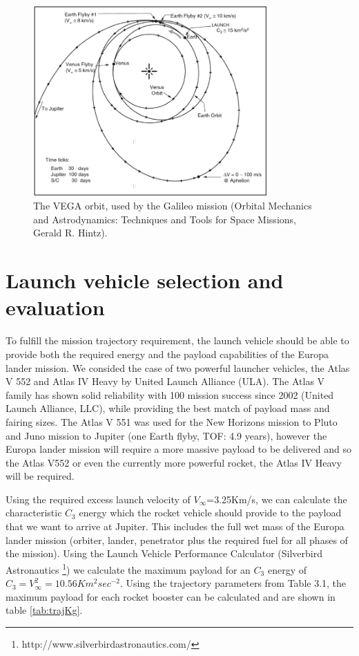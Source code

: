 \begin{figure}[htb!]
\centering
\includegraphics[width=0.8\textwidth]{figures/Orbiter/VEEGA.png}
\caption{The  VEGA orbit, used by the Galileo mission (Orbital Mechanics and Astrodynamics: Techniques and Tools for Space Missions, Gerald R. Hintz).}
\end{figure}
\section{Launch vehicle selection and evaluation}
To fulfill the mission trajectory requirement, the launch vehicle should be able to provide both the required energy and the payload capabilities of the Europa lander mission. We consided the case of two powerful launcher vehicles, the Atlas V 552 and Atlas IV Heavy by United Launch Alliance (ULA). The Atlas V family has shown solid reliability with 100 mission success since 2002 (United Launch Alliance, LLC), while providing the best match of payload mass and fairing sizes. The Atlas V 551 was used for the New Horizons mission to Pluto and Juno mission to Jupiter (one Earth flyby, TOF: 4.9 years), however the Europa lander mission will require a more massive payload to be delivered and so the Atlas V552 or even the currently more powerful rocket, the Atlas IV Heavy will be required. 

Using the required excess launch velocity of  $V_{\infty}$=3.25Km/s, we can calculate the characteristic $C_3$ energy which the rocket vehicle should provide to the payload that we want to arrive at Jupiter. This includes the full wet mass of the Europa lander mission (orbiter, lander, penetrator plus the required fuel for all phases of the mission). Using the Launch Vehicle Performance Calculator (Silverbird Astronautics \footnote{http://www.silverbirdastronautics.com/}) 
we calculate the maximum payload for an $C_3$ energy of $C_{3}=V_{\infty}^{2}=10.56 Km^2sec^{-2}$. Using the trajectory parameters from Table 3.1, the maximum payload for each rocket booster can be calculated and are shown in table \ref{tab:trajKg}.

